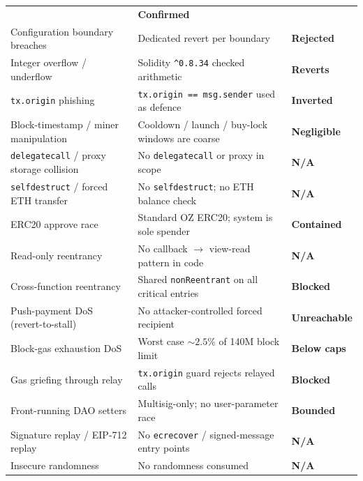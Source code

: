 \documentclass[11pt,a4paper]{article}
\begin{document}
\begin{center}
\begin{tabular}{p{5.6cm} p{5.4cm} p{3.5cm}}
    & \textcolor{passgreen}{\textbf{Confirmed}} \\
Configuration boundary breaches
    & Dedicated revert per boundary
    & \textcolor{passgreen}{\textbf{Rejected}} \\
\midrule
Integer overflow / underflow
    & Solidity \texttt{\^{}0.8.34} checked arithmetic
    & \textcolor{passgreen}{\textbf{Reverts}} \\
\texttt{tx.origin} phishing
    & \texttt{tx.origin == msg.sender} used as defence
    & \textcolor{passgreen}{\textbf{Inverted}} \\
Block-timestamp / miner manipulation
    & Cooldown / launch / buy-lock windows are coarse
    & \textcolor{passgreen}{\textbf{Negligible}} \\
\texttt{delegatecall} / proxy storage collision
    & No \texttt{delegatecall} or proxy in scope
    & \textcolor{passgreen}{\textbf{N/A}} \\
\texttt{selfdestruct} / forced ETH transfer
    & No \texttt{selfdestruct}; no ETH balance check
    & \textcolor{passgreen}{\textbf{N/A}} \\
ERC20 approve race
    & Standard OZ ERC20; system is sole spender
    & \textcolor{passgreen}{\textbf{Contained}} \\
Read-only reentrancy
    & No callback $\rightarrow$ view-read pattern in code
    & \textcolor{passgreen}{\textbf{N/A}} \\
Cross-function reentrancy
    & Shared \texttt{nonReentrant} on all critical entries
    & \textcolor{passgreen}{\textbf{Blocked}} \\
Push-payment DoS (revert-to-stall)
    & No attacker-controlled forced recipient
    & \textcolor{passgreen}{\textbf{Unreachable}} \\
Block-gas exhaustion DoS
    & Worst case $\sim 2.5\%$ of 140M block limit
    & \textcolor{passgreen}{\textbf{Below caps}} \\
Gas griefing through relay
    & \texttt{tx.origin} guard rejects relayed calls
    & \textcolor{passgreen}{\textbf{Blocked}} \\
Front-running DAO setters
    & Multisig-only; no user-parameter race
    & \textcolor{passgreen}{\textbf{Bounded}} \\
Signature replay / EIP-712 replay
    & No \texttt{ecrecover} / signed-message entry points
    & \textcolor{passgreen}{\textbf{N/A}} \\
Insecure randomness
    & No randomness consumed
    & \textcolor{passgreen}{\textbf{N/A}} \\

\end{tabular}
\end{center}
\end{document}
